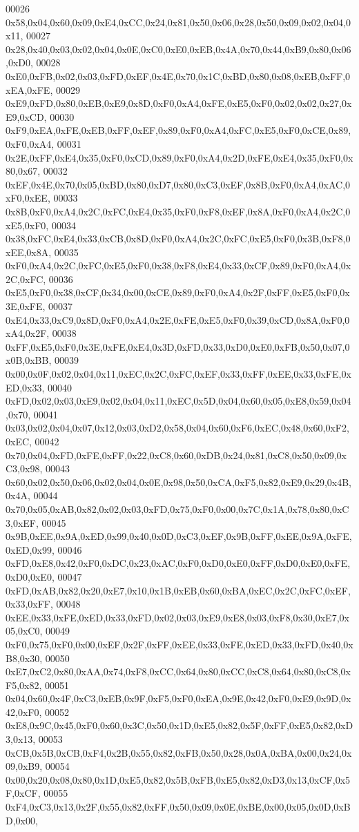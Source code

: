 \begin{DoxyCode}
00026 0x58,0x04,0x60,0x09,0xE4,0xCC,0x24,0x81,0x50,0x06,0x28,0x50,0x09,0x02,0x04,0x11,
00027 0x28,0x40,0x03,0x02,0x04,0x0E,0xC0,0xE0,0xEB,0x4A,0x70,0x44,0xB9,0x80,0x06,0xD0,
00028 0xE0,0xFB,0x02,0x03,0xFD,0xEF,0x4E,0x70,0x1C,0xBD,0x80,0x08,0xEB,0xFF,0xEA,0xFE,
00029 0xE9,0xFD,0x80,0xEB,0xE9,0x8D,0xF0,0xA4,0xFE,0xE5,0xF0,0x02,0x02,0x27,0xE9,0xCD,
00030 0xF9,0xEA,0xFE,0xEB,0xFF,0xEF,0x89,0xF0,0xA4,0xFC,0xE5,0xF0,0xCE,0x89,0xF0,0xA4,
00031 0x2E,0xFF,0xE4,0x35,0xF0,0xCD,0x89,0xF0,0xA4,0x2D,0xFE,0xE4,0x35,0xF0,0x80,0x67,
00032 0xEF,0x4E,0x70,0x05,0xBD,0x80,0xD7,0x80,0xC3,0xEF,0x8B,0xF0,0xA4,0xAC,0xF0,0xEE,
00033 0x8B,0xF0,0xA4,0x2C,0xFC,0xE4,0x35,0xF0,0xF8,0xEF,0x8A,0xF0,0xA4,0x2C,0xE5,0xF0,
00034 0x38,0xFC,0xE4,0x33,0xCB,0x8D,0xF0,0xA4,0x2C,0xFC,0xE5,0xF0,0x3B,0xF8,0xEE,0x8A,
00035 0xF0,0xA4,0x2C,0xFC,0xE5,0xF0,0x38,0xF8,0xE4,0x33,0xCF,0x89,0xF0,0xA4,0x2C,0xFC,
00036 0xE5,0xF0,0x38,0xCF,0x34,0x00,0xCE,0x89,0xF0,0xA4,0x2F,0xFF,0xE5,0xF0,0x3E,0xFE,
00037 0xE4,0x33,0xC9,0x8D,0xF0,0xA4,0x2E,0xFE,0xE5,0xF0,0x39,0xCD,0x8A,0xF0,0xA4,0x2F,
00038 0xFF,0xE5,0xF0,0x3E,0xFE,0xE4,0x3D,0xFD,0x33,0xD0,0xE0,0xFB,0x50,0x07,0x0B,0xBB,
00039 0x00,0x0F,0x02,0x04,0x11,0xEC,0x2C,0xFC,0xEF,0x33,0xFF,0xEE,0x33,0xFE,0xED,0x33,
00040 0xFD,0x02,0x03,0xE9,0x02,0x04,0x11,0xEC,0x5D,0x04,0x60,0x05,0xE8,0x59,0x04,0x70,
00041 0x03,0x02,0x04,0x07,0x12,0x03,0xD2,0x58,0x04,0x60,0xF6,0xEC,0x48,0x60,0xF2,0xEC,
00042 0x70,0x04,0xFD,0xFE,0xFF,0x22,0xC8,0x60,0xDB,0x24,0x81,0xC8,0x50,0x09,0xC3,0x98,
00043 0x60,0x02,0x50,0x06,0x02,0x04,0x0E,0x98,0x50,0xCA,0xF5,0x82,0xE9,0x29,0x4B,0x4A,
00044 0x70,0x05,0xAB,0x82,0x02,0x03,0xFD,0x75,0xF0,0x00,0x7C,0x1A,0x78,0x80,0xC3,0xEF,
00045 0x9B,0xEE,0x9A,0xED,0x99,0x40,0x0D,0xC3,0xEF,0x9B,0xFF,0xEE,0x9A,0xFE,0xED,0x99,
00046 0xFD,0xE8,0x42,0xF0,0xDC,0x23,0xAC,0xF0,0xD0,0xE0,0xFF,0xD0,0xE0,0xFE,0xD0,0xE0,
00047 0xFD,0xAB,0x82,0x20,0xE7,0x10,0x1B,0xEB,0x60,0xBA,0xEC,0x2C,0xFC,0xEF,0x33,0xFF,
00048 0xEE,0x33,0xFE,0xED,0x33,0xFD,0x02,0x03,0xE9,0xE8,0x03,0xF8,0x30,0xE7,0x05,0xC0,
00049 0xF0,0x75,0xF0,0x00,0xEF,0x2F,0xFF,0xEE,0x33,0xFE,0xED,0x33,0xFD,0x40,0xB8,0x30,
00050 0xE7,0xC2,0x80,0xAA,0x74,0xF8,0xCC,0x64,0x80,0xCC,0xC8,0x64,0x80,0xC8,0xF5,0x82,
00051 0x04,0x60,0x4F,0xC3,0xEB,0x9F,0xF5,0xF0,0xEA,0x9E,0x42,0xF0,0xE9,0x9D,0x42,0xF0,
00052 0xE8,0x9C,0x45,0xF0,0x60,0x3C,0x50,0x1D,0xE5,0x82,0x5F,0xFF,0xE5,0x82,0xD3,0x13,
00053 0xCB,0x5B,0xCB,0xF4,0x2B,0x55,0x82,0xFB,0x50,0x28,0x0A,0xBA,0x00,0x24,0x09,0xB9,
00054 0x00,0x20,0x08,0x80,0x1D,0xE5,0x82,0x5B,0xFB,0xE5,0x82,0xD3,0x13,0xCF,0x5F,0xCF,
00055 0xF4,0xC3,0x13,0x2F,0x55,0x82,0xFF,0x50,0x09,0x0E,0xBE,0x00,0x05,0x0D,0xBD,0x00,

\end{DoxyCode}
